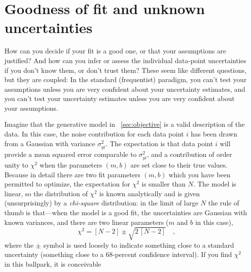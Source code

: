 \documentclass[12pt,twoside,pdftex]{article}
\begin{document}
\section{Goodness of fit and unknown uncertainties}\label{sec:goodness}

How can you decide if your fit is a good one, or that your assumptions
are justified?  And how can you infer or assess the individual
data-point uncertainties if you don't know them, or don't trust them?
These seem like different questions, but they are coupled: In the
standard (frequentist) paradigm, you can't test your assumptions
unless you are very confident about your uncertainty estimates, and
you can't test your uncertainty estimates unless you are very
confident about your assumptions.

Imagine that the generative model in \sectionname~\ref{sec:objective}
is a valid description of the data.  In this case, the noise
contribution for each data point $i$ has been drawn from a Gaussian
with variance $\sigma_{yi}^2$.  The expectation is that data point $i$
will provide a mean squared error comparable to $\sigma_{yi}^2$, and a
contribution of order unity to $\chi^2$ when the parameters $(m,b)$
are set close to their true values.  Because in detail there are two
fit parameters $(m,b)$ which you have been permitted to optimize, the
expectation for $\chi^2$ is smaller than $N$. The model is linear, so
the distribution of $\chi^2$ is known analytically and is given
(unsurprisingly) by a \emph{chi-square} distribution: in the limit of
large $N$ the rule of thumb is that---when the model is a good fit,
the uncertainties are Gaussian with known variances, and there are two
linear parameters ($m$ and $b$ in this case),
\begin{equation}
\chi^2 = [N-2] \pm \sqrt{2\,[N-2]} \quad ,
\end{equation}
where the $\pm$ symbol is used loosely to indicate something close to
a standard uncertainty (something close to a 68-percent confidence
interval).  If you find $\chi^2$ in this ballpark, it is conceivable
\end{document}
